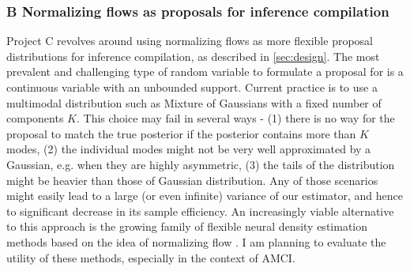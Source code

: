 \documentclass[12pt]{article}
\begin{document}
\subsubsection*{B \quad Normalizing flows as proposals for inference compilation}
Project C revolves around using normalizing flows as more flexible proposal distributions for inference compilation, as described in \autoref{sec:design}.
The most prevalent and challenging type of random variable to formulate a proposal for is a continuous variable with an unbounded support.
Current practice is to use a multimodal distribution such as Mixture of Gaussians with a fixed number of components $K$.
This choice may fail in several ways - 
(1) there is no way for the proposal to match the true posterior if the posterior contains more than $K$ modes,
(2) the individual modes might not be very well approximated by a Gaussian, e.g. when they are highly asymmetric,
(3) the tails of the distribution might be heavier than those of Gaussian distribution.
Any of those scenarios might easily lead to a large (or even infinite) variance of our estimator, and hence to significant decrease in its sample efficiency.
An increasingly viable alternative to this approach is the growing family of flexible neural density estimation methods based on the idea of normalizing flow \citep{RezendeMohamed2015}.
I am planning to evaluate the utility of these methods, especially in the context of AMCI. 
\end{document}

